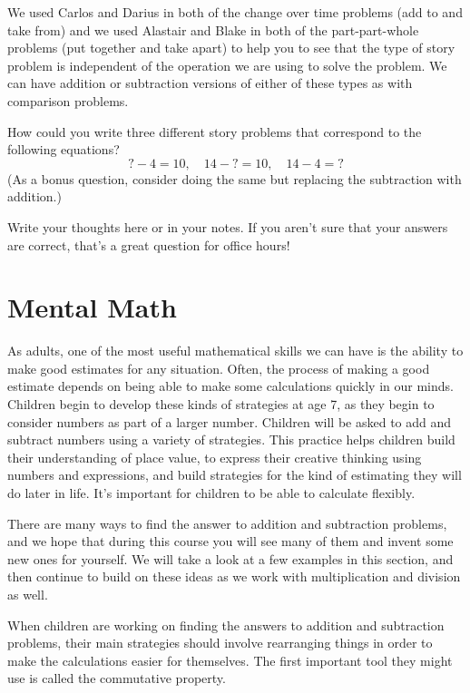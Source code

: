 \documentclass{ximera}
\begin{document}
We used Carlos and Darius in both of the change over time problems (add to and take from) and we used Alastair and Blake in both of the part-part-whole problems (put together and take apart) to help you to see that the type of story problem is independent of the operation we are using to solve the problem. We can have addition or subtraction versions of either of these types as with comparison problems.



\begin{question}
How could you write three different story problems that correspond to the following equations?
\[
? - 4 = 10, \quad 14 - ? = 10, \quad 14-4=?
\]
(As a bonus question, consider doing the same but replacing the subtraction with addition.)
\begin{freeResponse}
Write your thoughts here or in your notes. If you aren't sure that your answers are correct, that's a great question for office hours!
\end{freeResponse}
\end{question}



\section{Mental Math}

As adults, one of the most useful mathematical skills we can have is the ability to make good estimates for any situation. Often, the process of making a good estimate depends on being able to make some calculations quickly in our minds. Children begin to develop these kinds of strategies at age 7, as they begin to consider numbers as part of a larger number. Children will be asked to add and subtract numbers using a variety of strategies. This practice helps children build their understanding of place value, to express their creative thinking using numbers and expressions, and build strategies for the kind of estimating they will do later in life. It's important for children to be able to calculate flexibly.

There are many ways to find the answer to addition and subtraction problems, and we hope that during this course you will see many of them and invent some new ones for yourself. We will take a look at a few examples in this section, and then continue to build on these ideas as we work with multiplication and division as well. 

When children are working on finding the answers to addition and subtraction problems, their main strategies should involve rearranging things in order to make the calculations easier for themselves. The first important tool they might use is called the commutative property.
\end{document}
